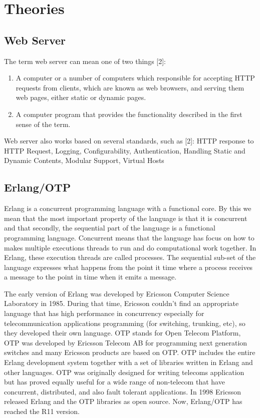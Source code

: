 \documentclass[final,
notitlepage,
narroweqnarray,
    inline,
    twoside,
]{ieee}
\begin{document}
\section{Theories}

\subsection{Web Server}

The term web server can mean one of two things [2]:

\begin{enumerate}
\item A computer or a number of computers which responsible for
accepting HTTP requests from clients, which are known as web
browsers, and serving them web pages, either static or dynamic
pages.

\item A computer program that provides the functionality described
in the first sense of the term.
\end{enumerate}

Web server also works based on several standards, such as [2]:
HTTP response to HTTP Request, Logging, Configurability,
Authentication, Handling Static and Dynamic Contents, Modular
Support, Virtual Hosts



\subsection{Erlang/OTP}

Erlang is a concurrent programming language with a functional
core. By this we mean that the most important property of the
language is that it is concurrent and that secondly, the
sequential part of the language is a functional programming
language. Concurrent means that the language has focus on how to
makes multiple executions threads to run and do computational work
together. In Erlang, these execution threads are called processes.
The sequential sub-set of the language expresses what happens from
the point it time where a process receives a message to the point
in time when it emits a message.

The early version of Erlang was developed by Ericsson Computer
Science Laboratory in 1985. During that time, Ericsson couldn't
find an appropriate language that has high performance in
concurrency especially for telecommunication applications
programming (for switching, trunking, etc), so they developed
their own language. OTP stands for Open Telecom Platform, OTP was
developed by Ericsson Telecom AB for programming next generation
switches and many Ericsson products are based on OTP. OTP includes
the entire Erlang development system together with a set of
libraries written in Erlang and other languages. OTP was
originally designed for writing telecoms application but has
proved equally useful for a wide range of non-telecom that have
concurrent, distributed, and also fault tolerant applications. In
1998 Ericsson released Erlang and the OTP libraries as open
source. Now, Erlang/OTP has reached the R11 version.
\end{document}
